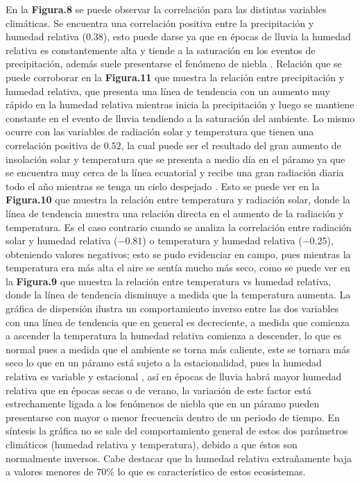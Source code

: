 \documentclass[conference,final,]{IEEEtran}
\begin{document}
En la \textbf{Figura.8} se puede observar la correlación para las distintas
variables climáticas. Se encuentra una correlación positiva entre la
precipitación y humedad relativa (\(0.38\)), esto puede darse ya que en
épocas de lluvia la humedad relativa es constantemente alta y tiende a
la saturación en los eventos de precipitación, además suele presentarse
el fenómeno de niebla \citep{morales2019atlas}. Relación que se puede
corroborar en la \textbf{Figura.11} que muestra la relación entre
precipitación y humedad relativa, que presenta una línea de tendencia
con un aumento muy rápido en la humedad relativa mientras inicia la
precipitación y luego se mantiene constante en el evento de lluvia
tendiendo a la saturación del ambiente. Lo mismo ocurre con las
variables de radiación solar y temperatura que tienen una correlación
positiva de \(0.52\), la cual puede ser el resultado del gran aumento de
insolación solar y temperatura que se presenta a medio día en el páramo
ya que se encuentra muy cerca de la línea ecuatorial y recibe una gran
radiación diaria todo el año mientras se tenga un cielo despejado
\citep{buytaert2006hidrologia}. Esto se puede ver en la \textbf{Figura.10}
que muestra la relación entre temperatura y radiación solar, donde la
línea de tendencia muestra una relación directa en el aumento de la
radiación y temperatura. Es el caso contrario cuando se analiza la
correlación entre radiación solar y humedad relativa (\(-0.81\)) o
temperatura y humedad relativa (\(-0.25\)), obteniendo valores
negativos; esto se pudo evidenciar en campo, pues mientras la
temperatura era más alta el aire se sentía mucho más seco, como se puede
ver en la \textbf{Figura.9} que muestra la relación entre temperatura vs
humedad relativa, donde la línea de tendencia disminuye a medida que la
temperatura aumenta. La gráfica de dispersión ilustra un comportamiento
inverso entre las dos variables con una línea de tendencia que en
general es decreciente, a medida que comienza a ascender la temperatura
la humedad relativa comienza a descender, lo que es normal pues a medida
que el ambiente se torna más caliente, este se tornara más seco lo que
en un páramo está sujeto a la estacionalidad, pues la humedad relativa
es variable y estacional \citep{hofstede2017p}, así en épocas de lluvia
habrá mayor humedad relativa que en épocas secas o de verano, la
variación de este factor está estrechamente ligada a los fenómenos de
niebla que en un páramo pueden presentarse con mayor o menor frecuencia
dentro de un periodo de tiempo. En síntesis la gráfica no se sale del
comportamiento general de estos dos parámetros climáticos (humedad
relativa y temperatura), debido a que éstos son normalmente inversos.
Cabe destacar que la humedad relativa extrañamente baja a valores
menores de \(70 \%\) lo que es característico de estos ecosistemas.
\citep{hofstede2017p}
\end{document}
